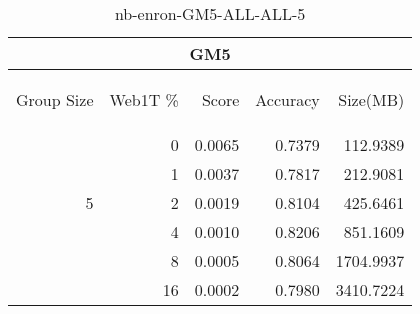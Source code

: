 \begin{center}
\begin{table}[htbp] 
 \begin{center}
\begin{tabular}{ | r | r | r | r | r |}
\hline
\multicolumn{5}{|c|}{GM5}\\
\hline
\begin{sideways}Group Size\end{sideways} & \begin{sideways}Web1T \%\end{sideways} & \begin{sideways}Score\end{sideways} & \begin{sideways}Accuracy\end{sideways} & \begin{sideways}Size(MB)\end{sideways}\\
\hline
\multirow{5}{*}{5}
 & 0 & 0.0065 & 0.7379 & 112.9389\\ \cline{2-5}
 & 1 & 0.0037 & 0.7817 & 212.9081\\ \cline{2-5}
 & 2 & 0.0019 & 0.8104 & 425.6461\\ \cline{2-5}
 & 4 & 0.0010 & 0.8206 & 851.1609\\ \cline{2-5}
 & 8 & 0.0005 & 0.8064 & 1704.9937\\ \cline{2-5}
 & 16 & 0.0002 & 0.7980 & 3410.7224\\ \cline{2-5}
\hline
\end{tabular}
\caption{nb-enron-GM5-ALL-ALL-5}
\label{table:nb-enron-GM5-ALL-ALL-5}
\end{center}
 \end{table}
\end{center}

